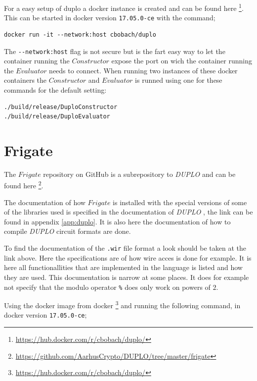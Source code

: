 \documentclass[twoside,11pt,openright]{report}
\newcommand{\DUPLO}{\textit{DUPLO} }
\begin{document}
\begin{appendices}
\bigskip

For a easy setup of duplo a docker instance is created and can be found here \footnote{\url{https://hub.docker.com/r/cbobach/duplo/}}. This can be started in docker version \verb|17.05.0-ce| with the command;

\begin{center}
\begin{verbatim}
docker run -it --network:host cbobach/duplo
\end{verbatim}
\end{center}

The \verb|--network:host| flag is not secure but is the fart easy way to let the container running the $Constructor$ expose the port on wich the container running the $Evaluator$ needs to connect. When running two instances of these docker containers the $Constructor$ and $Evaluator$ is runned using one for these commands for the default setting:

\begin{center}
\begin{verbatim}
./build/release/DuploConstructor 
./build/release/DuploEvaluator
\end{verbatim}
\end{center}


\section{Frigate}
\label{app:frigate}
The $Frigate$ repository on GitHub is a subrepository to \DUPLO and can be found here \footnote{\url{https://github.com/AarhusCrypto/DUPLO/tree/master/frigate}}.

The documentation of how $Frigate$ is installed with the special versions of some of the libraries used is specified in the documentation of \DUPLO, the link can be found in appendix \ref{app:duplo}. It is also here the documentation of how to compile \DUPLO circuit formats are done.

To find the documentation of the \verb|.wir| file format a look should be taken at the link above. Here the specifications are of how wire acces is done for example. It is here all functionallities that are implemented in the language is listed and how they are used. This documentation is narrow at some places. It does for example not specify that the modulo operator \verb|%| does only work on powers of $2$.

\bigskip

Using the docker image from docker \footnote{\url{https://hub.docker.com/r/cbobach/duplo/}} and running the following command, in docker version \verb|17.05.0-ce|;


\end{appendices}
\end{document}
